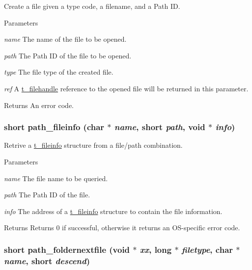 Create a file given a type code, a filename, and a Path ID. 
\begin{DoxyParams}{Parameters}
\item[{\em name}]The name of the file to be opened. \item[{\em path}]The Path ID of the file to be opened. \item[{\em type}]The file type of the created file. \item[{\em ref}]A \hyperlink{group__files_gafcb776aa74d514754e83b30995b5a5d1}{t\_\-filehandle} reference to the opened file will be returned in this parameter. \end{DoxyParams}
\begin{DoxyReturn}{Returns}
An error code. 
\end{DoxyReturn}
\hypertarget{group__files_gab07291dc4afe564d85e458918da19df1}{
\subsubsection[{path\_\-fileinfo}]{\setlength{\rightskip}{0pt plus 5cm}short path\_\-fileinfo (char $\ast$ {\em name}, \/  short {\em path}, \/  void $\ast$ {\em info})}}
\label{group__files_gab07291dc4afe564d85e458918da19df1}


Retrive a \hyperlink{structt__fileinfo}{t\_\-fileinfo} structure from a file/path combination. 
\begin{DoxyParams}{Parameters}
\item[{\em name}]The file name to be queried. \item[{\em path}]The Path ID of the file. \item[{\em info}]The address of a \hyperlink{structt__fileinfo}{t\_\-fileinfo} structure to contain the file information.\end{DoxyParams}
\begin{DoxyReturn}{Returns}
Returns 0 if successful, otherwise it returns an OS-\/specific error code. 
\end{DoxyReturn}
\hypertarget{group__files_ga50f5d1b1d008024bffd65155be7e2721}{
\subsubsection[{path\_\-foldernextfile}]{\setlength{\rightskip}{0pt plus 5cm}short path\_\-foldernextfile (void $\ast$ {\em xx}, \/  long $\ast$ {\em filetype}, \/  char $\ast$ {\em name}, \/  short {\em descend})}}
\label{group__files_ga50f5d1b1d008024bffd65155be7e2721}


